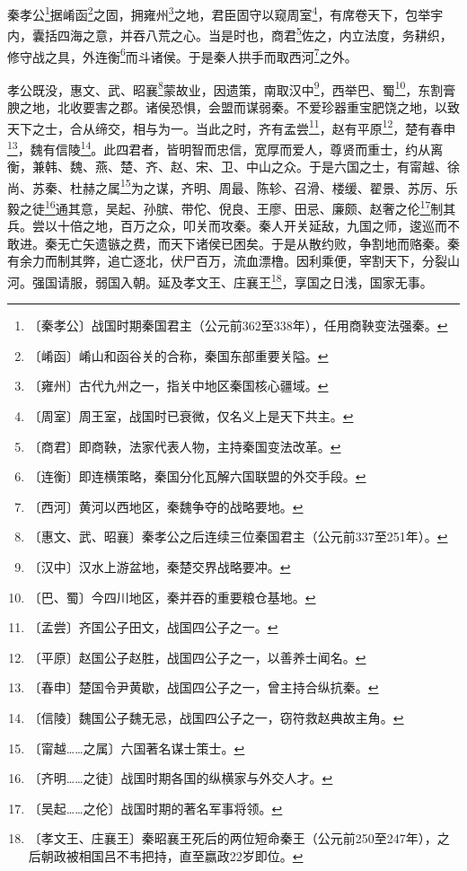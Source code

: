 \documentclass[12pt,UTF-8,openany,a4]{ctexbook}
\begin{document}
\begin{large}
    
    秦孝公\footnote{〔秦孝公〕\yiwen 战国时期秦国君主（公元前362至338年），任用商鞅变法强秦。}据崤函\footnote{〔崤函〕\yiwen 崤山和函谷关的合称，秦国东部重要关隘。}之固，拥雍州\footnote{〔雍州〕\yiwen 古代九州之一，指关中地区秦国核心疆域。}之地，君臣固守以窥周室\footnote{〔周室〕\yiwen 周王室，战国时已衰微，仅名义上是天下共主。}，有席卷天下，包举宇内，囊括四海之意，并吞八荒之心。当是时也，商君\footnote{〔商君〕\yiwen 即商鞅，法家代表人物，主持秦国变法改革。}佐之，内立法度，务耕织，修守战之具，外连衡\footnote{〔连衡〕\yiwen 即连横策略，秦国分化瓦解六国联盟的外交手段。}而斗诸侯。于是秦人拱手而取西河\footnote{〔西河〕\yiwen 黄河以西地区，秦魏争夺的战略要地。}之外。
    
    孝公既没，惠文、武、昭襄\footnote{〔惠文、武、昭襄〕\yiwen 秦孝公之后连续三位秦国君主（公元前337至251年）。}蒙故业，因遗策，南取汉中\footnote{〔汉中〕\yiwen 汉水上游盆地，秦楚交界战略要冲。}，西举巴、蜀\footnote{〔巴、蜀〕\yiwen 今四川地区，秦并吞的重要粮仓基地。}，东割膏腴之地，北收要害之郡。诸侯恐惧，会盟而谋弱秦。不爱珍器重宝肥饶之地，以致天下之士，合从缔交，相与为一。当此之时，齐有孟尝\footnote{〔孟尝〕\yiwen 齐国公子田文，战国四公子之一。}，赵有平原\footnote{〔平原〕\yiwen 赵国公子赵胜，战国四公子之一，以善养士闻名。}，楚有春申\footnote{〔春申〕\yiwen 楚国令尹黄歇，战国四公子之一，曾主持合纵抗秦。}，魏有信陵\footnote{〔信陵〕\yiwen 魏国公子魏无忌，战国四公子之一，窃符救赵典故主角。}。此四君者，皆明智而忠信，宽厚而爱人，尊贤而重士，约从离衡，兼韩、魏、燕、楚、齐、赵、宋、卫、中山之众。于是六国之士，有甯越、徐尚、苏秦、杜赫之属\footnote{〔甯越……之属〕\yiwen 六国著名谋士策士。}为之谋，齐明、周最、陈轸、召滑、楼缓、翟景、苏厉、乐毅之徒\footnote{〔齐明……之徒〕\yiwen 战国时期各国的纵横家与外交人才。}通其意，吴起、孙膑、带佗、倪良、王廖、田忌、廉颇、赵奢之伦\footnote{〔吴起……之伦〕\yiwen 战国时期的著名军事将领。}制其兵。尝以十倍之地，百万之众，叩关而攻秦。秦人开关延敌，九国之师，逡巡而不敢进。秦无亡矢遗镞之费，而天下诸侯已困矣。于是从散约败，争割地而赂秦。秦有余力而制其弊，追亡逐北，伏尸百万，流血漂橹。因利乘便，宰割天下，分裂山河。强国请服，弱国入朝。延及孝文王、庄襄王\footnote{〔孝文王、庄襄王〕\yiwen 秦昭襄王死后的两位短命秦王（公元前250至247年），之后朝政被相国吕不韦把持，直至嬴政22岁即位。}，享国之日浅，国家无事。
    

\end{large}
\end{document}
